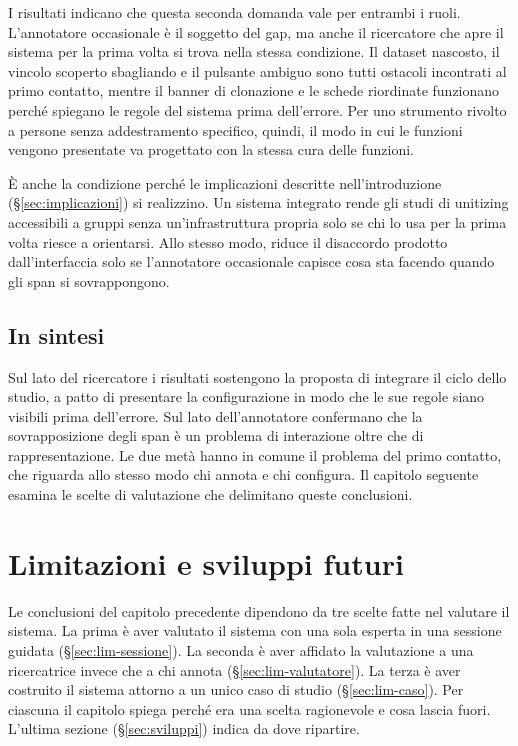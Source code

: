 \documentclass[]{sapthesis}
\begin{document}
I risultati indicano che questa seconda domanda vale per entrambi i ruoli. L'annotatore occasionale è il soggetto del gap, ma anche il ricercatore che apre il sistema per la prima volta si trova nella stessa condizione. Il dataset nascosto, il vincolo scoperto sbagliando e il pulsante ambiguo sono tutti ostacoli incontrati al primo contatto, mentre il banner di clonazione e le schede riordinate funzionano perché spiegano le regole del sistema prima dell'errore. Per uno strumento rivolto a persone senza addestramento specifico, quindi, il modo in cui le funzioni vengono presentate va progettato con la stessa cura delle funzioni.

È anche la condizione perché le implicazioni descritte nell'introduzione (\S\ref{sec:implicazioni}) si realizzino. Un sistema integrato rende gli studi di unitizing accessibili a gruppi senza un'infrastruttura propria solo se chi lo usa per la prima volta riesce a orientarsi. Allo stesso modo, riduce il disaccordo prodotto dall'interfaccia solo se l'annotatore occasionale capisce cosa sta facendo quando gli span si sovrappongono.

\section{In sintesi}
\label{sec:disc-sintesi}

Sul lato del ricercatore i risultati sostengono la proposta di integrare il ciclo dello studio, a patto di presentare la configurazione in modo che le sue regole siano visibili prima dell'errore. Sul lato dell'annotatore confermano che la sovrapposizione degli span è un problema di interazione oltre che di rappresentazione. Le due metà hanno in comune il problema del primo contatto, che riguarda allo stesso modo chi annota e chi configura. Il capitolo seguente esamina le scelte di valutazione che delimitano queste conclusioni.

\chapter{Limitazioni e sviluppi futuri}
\label{chap:limitazioni}

Le conclusioni del capitolo precedente dipendono da tre scelte fatte nel valutare il sistema. La prima è aver valutato il sistema con una sola esperta in una sessione guidata (\S\ref{sec:lim-sessione}). La seconda è aver affidato la valutazione a una ricercatrice invece che a chi annota (\S\ref{sec:lim-valutatore}). La terza è aver costruito il sistema attorno a un unico caso di studio (\S\ref{sec:lim-caso}). Per ciascuna il capitolo spiega perché era una scelta ragionevole e cosa lascia fuori. L'ultima sezione (\S\ref{sec:sviluppi}) indica da dove ripartire.
\end{document}
